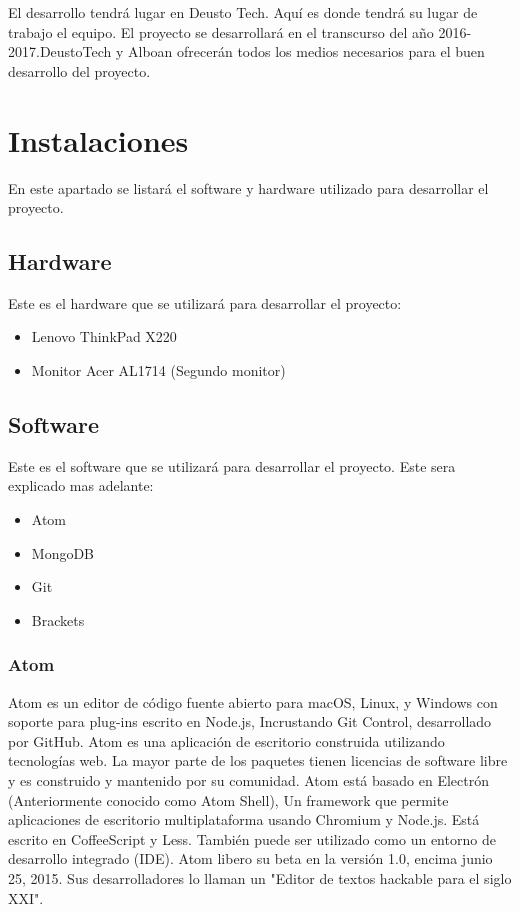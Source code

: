 El desarrollo tendrá lugar en Deusto Tech. Aquí es donde tendrá su lugar de trabajo el equipo. El proyecto se desarrollará en el transcurso del año 2016-2017.DeustoTech y Alboan ofrecerán todos los medios necesarios para el buen desarrollo del proyecto.

\section{Instalaciones}
En este apartado se listará el software y hardware utilizado para desarrollar el proyecto.

\subsection{Hardware}
Este es el hardware que se utilizará para desarrollar el proyecto:
\begin{itemize}
	\item Lenovo ThinkPad X220
	\item Monitor Acer AL1714 (Segundo monitor)
\end{itemize}

\subsection{Software}
Este es el software que se utilizará para desarrollar el proyecto. Este sera explicado mas adelante:
\begin{itemize}
	\item Atom
	\item MongoDB
	\item Git
	\item Brackets
\end{itemize}

\subsubsection{Atom}
Atom es un editor de código fuente abierto para macOS, Linux, y Windows con soporte para plug-ins escrito en Node.js, Incrustando Git Control, desarrollado por GitHub. Atom es una aplicación de escritorio construida utilizando tecnologías web. La mayor parte de los paquetes tienen licencias de software libre y es construido y mantenido por su comunidad. Atom está basado en Electrón (Anteriormente conocido como Atom Shell), Un framework que permite aplicaciones de escritorio multiplataforma usando Chromium y Node.js. Está escrito en CoffeeScript y Less. También puede ser utilizado como un entorno de desarrollo integrado (IDE). Atom libero su beta en la versión 1.0, encima junio 25, 2015. Sus desarrolladores lo llaman un "Editor de textos hackable para el siglo XXI".


